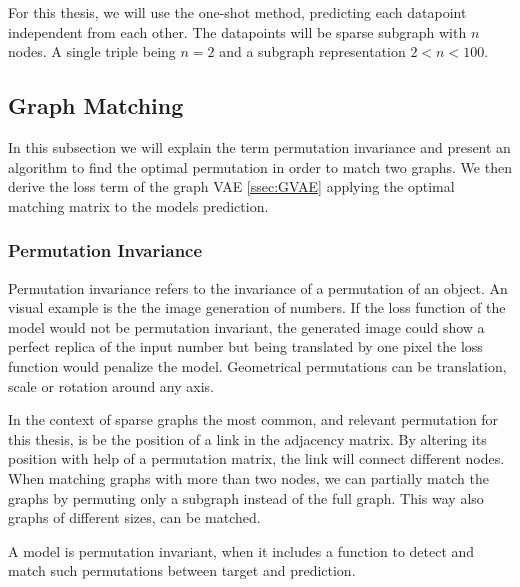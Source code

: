 For this thesis, we will use the one-shot method, predicting each datapoint independent from each other. The datapoints will be sparse subgraph with $n$ nodes. A single triple being $n=2$ and a subgraph representation $2<n<100$. 

\subsection{Graph Matching}
\label{ssec:graphmatch}
In this subsection we will explain the term permutation invariance and present an algorithm to find the optimal permutation in order to match two graphs. We then derive the loss term of the graph VAE \ref{ssec:GVAE} applying the optimal matching matrix to the models prediction.

\subsubsection{Permutation Invariance}


Permutation invariance refers to the invariance of a permutation of an object. An visual example is the the image generation of numbers. If the loss function of the model would not be permutation invariant, the generated image could show a perfect replica of the input number but being translated by one pixel the loss function would penalize the model. Geometrical permutations can be translation, scale or rotation around any axis. 

In the context of sparse graphs the most common, and relevant permutation for this thesis, is be the position of a link in the adjacency matrix. By altering its position with help of a permutation matrix, the link will connect different nodes. When matching graphs with more than two nodes, we can partially match the graphs by permuting only a subgraph instead of the full graph. This way also graphs of different sizes, can be matched. 

A model is permutation invariant, when it includes a function to detect and match such permutations between target and prediction. 



